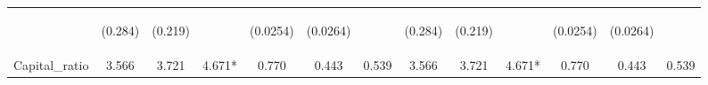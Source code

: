 \documentclass[]{article}
\begin{document}
\begin{center}
\begin{tabular}{lcccccccccccc}
\vspace{4pt} & \begin{footnotesize}(0.284)\end{footnotesize} & \begin{footnotesize}(0.219)\end{footnotesize} & \begin{footnotesize}\end{footnotesize} & \begin{footnotesize}(0.0254)\end{footnotesize} & \begin{footnotesize}(0.0264)\end{footnotesize} & \begin{footnotesize}\end{footnotesize} & \begin{footnotesize}(0.284)\end{footnotesize} & \begin{footnotesize}(0.219)\end{footnotesize} & \begin{footnotesize}\end{footnotesize} & \begin{footnotesize}(0.0254)\end{footnotesize} & \begin{footnotesize}(0.0264)\end{footnotesize} & \begin{footnotesize}\end{footnotesize} \\
Capital\_ratio & 3.566 & 3.721 & 4.671* & 0.770 & 0.443 & 0.539 & 3.566 & 3.721 & 4.671* & 0.770 & 0.443 & 0.539 \\

\end{tabular}
\end{center}
\end{document}
